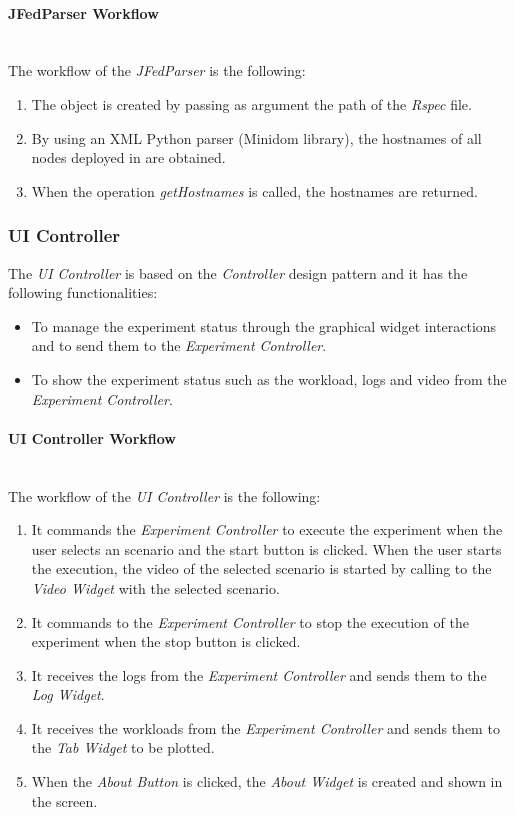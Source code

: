 \paragraph{JFedParser Workflow}~\\

The workflow of the \emph{JFedParser} is the following:
\begin{enumerate}
\item The object is created by passing as argument the path of the \emph{Rspec} file.
\item By using an \ac{XML} Python parser (Minidom library), the hostnames of all nodes deployed in \vw are obtained.
\item When the operation \emph{getHostnames} is called, the hostnames are returned.
\end{enumerate}

\subsubsection{UI Controller}

The \emph{UI Controller} is based on the \emph{Controller} design pattern and it has the following functionalities:
\begin{itemize}
\item To manage the experiment status through the graphical widget interactions and to send them to the \emph{Experiment Controller}.
\item To show the experiment status such as the workload, logs and video from the \emph{Experiment Controller}.
\end{itemize}

\paragraph{UI Controller Workflow}~\\

The workflow of the \emph{UI Controller} is the following:
\begin{enumerate}
\item It commands the \emph{Experiment Controller} to execute the experiment when the user selects an scenario and  the start button is clicked. When the user starts the execution, the video of the selected scenario is started by calling to the \emph{Video Widget} with the selected scenario.
\item  It commands to the \emph{Experiment Controller} to stop the execution of the experiment when the stop button is clicked.
\item It receives the logs from the \emph{Experiment Controller} and sends them to the \emph{Log Widget}.
\item It receives the workloads from the \emph{Experiment Controller} and sends them to the \emph{Tab Widget} to be plotted.
\item When the \emph{About Button} is clicked, the \emph{About Widget} is created and shown in the screen.
\end{enumerate}


